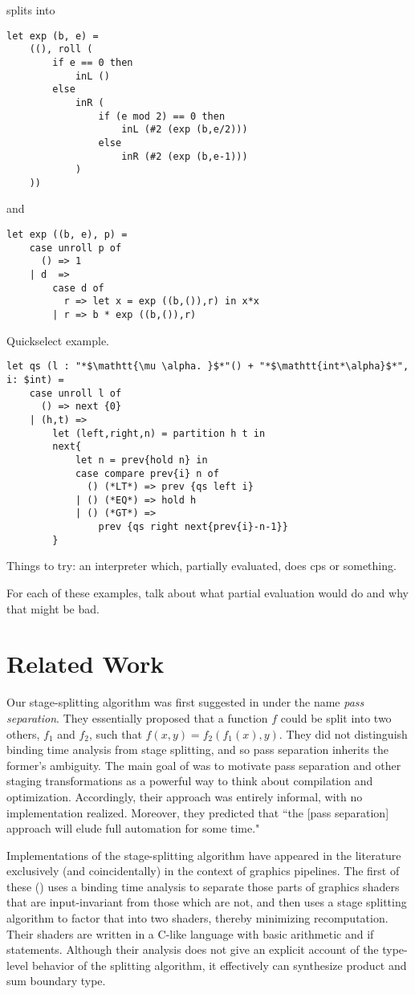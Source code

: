 \documentclass{sigplanconf}
\begin{document}
splits into

\begin{lstlisting} 
let exp (b, e) =
	((), roll (
		if e == 0 then
			inL ()
		else 
			inR (
				if (e mod 2) == 0 then
					inL (#2 (exp (b,e/2)))
				else
					inR (#2 (exp (b,e-1)))
			)
	))
\end{lstlisting}

and

\begin{lstlisting} 
let exp ((b, e), p) =
	case unroll p of
	  () => 1
	| d  =>
		case d of
		  r => let x = exp ((b,()),r) in x*x
		| r => b * exp ((b,()),r)
\end{lstlisting}

Quickselect example.

\begin{lstlisting} 
let qs (l : "*$\mathtt{\mu \alpha. }$*"() + "*$\mathtt{int*\alpha}$*", i: $int) = 
	case unroll l of
	  () => next {0}
	| (h,t) => 
		let (left,right,n) = partition h t in
		next{
			let n = prev{hold n} in
			case compare prev{i} n of
			  () (*LT*) => prev {qs left i}
			| () (*EQ*) => hold h
			| () (*GT*) => 
				prev {qs right next{prev{i}-n-1}}
		}	
\end{lstlisting}

Things to try: an interpreter which, partially evaluated, does cps or something.

For each of these examples, talk about what partial evaluation would do and why that might be bad.

\section{Related Work}

Our stage-splitting algorithm was first suggested in \cite{jorring86} under the name {\em pass separation}.  They essentially proposed that a function $f$ could be split into two others, $f_1$ and $f_2$, such that $f(x,y)=f_2(f_1(x),y)$.  They did not distinguish binding time analysis from stage splitting, and so pass separation inherits the former's ambiguity.  The main goal of \cite{jorring86} was to motivate pass separation and other staging transformations as a powerful way to think about compilation and optimization.  Accordingly, their approach was entirely informal, with no implementation realized.  Moreover, they predicted that ``the [pass separation] approach will elude full automation for some time."  

Implementations of the stage-splitting algorithm have appeared in the literature exclusively (and coincidentally) in the context of graphics pipelines.  The first of these (\cite{knoblock96}) uses a binding time analysis to separate those parts of graphics shaders that are input-invariant from those which are not, and then uses a stage splitting algorithm to factor that into two shaders, thereby minimizing recomputation.  Their shaders are written in a C-like language with basic arithmetic and if statements.  Although their analysis does not give an explicit account of the type-level behavior of the splitting algorithm, it effectively can synthesize product and sum boundary type.  
\end{document}
